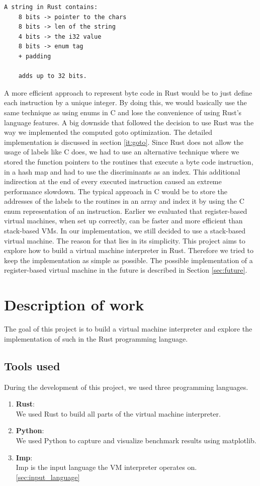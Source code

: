 \documentclass{article}
\begin{document}
\begin{verbatim}
A string in Rust contains:
    8 bits -> pointer to the chars
    8 bits -> len of the string
    4 bits -> the i32 value
    8 bits -> enum tag
    + padding

    adds up to 32 bits.
\end{verbatim}

A more efficient approach to represent byte code in Rust would be to just
define each instruction by a unique integer. By doing this, we would basically
use the same technique as using enums in C and lose the convenience of using
Rust's language features.
A big downside that followed the decision to use Rust was the way we
implemented the computed goto optimization. The detailed implementation is
discussed in section \ref{it:goto}. Since Rust does not allow the usage of
labels like C does, we had to use an alternative technique where we stored the
function pointers to the routines that execute a byte code instruction, in a
hash map and had to use the discriminants as an index. This additional
indirection at the end of every executed instruction caused an extreme
performance slowdown. The typical approach in C would be to store the addresses
of the labels to the routines in an array and index it by using the C enum
representation of an instruction.
Earlier we evaluated that register-based virtual machines, when set up
correctly, can be faster and more efficient than stack-based VMs.
In our implementation, we still decided to use a stack-based virtual machine.
The reason for that lies in its simplicity. This project aims to explore
how to build a virtual machine interpreter in Rust. Therefore we tried to
keep the implementation as simple as possible. The possible implementation of
a register-based virtual machine in the future is described in Section
\ref{sec:future}.

\section{Description of work}
The goal of this project is to build a virtual machine interpreter and 
explore the implementation of such in the Rust programming language.

\subsection{Tools used}
During the development of this project, we used three programming languages. 

\begin{enumerate}
    \item \textbf{Rust}:\\
        We used Rust to build all parts of the virtual machine interpreter.
    \item \textbf{Python}:\\
        We used Python to capture and visualize benchmark results using matplotlib.
    \item \textbf{Imp}:\\
        Imp is the input language the VM interpreter operates on. \ref{sec:input_language}
\end{enumerate}
\end{document}
